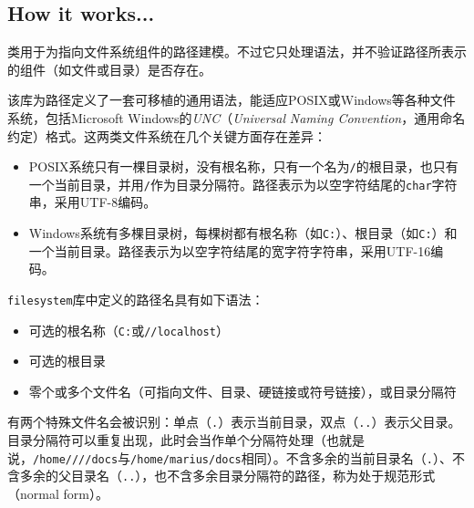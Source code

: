 
\subsection{How it works...}



类用于为指向文件系统组件的路径建模。不过它只处理语法，并不验证路径所表示的组件（如文件或目录）是否存在。



该库为路径定义了一套可移植的通用语法，能适应POSIX或Windows等各种文件系统，包括Microsoft Windows的\textit{UNC}（\textit{Universal} \textit{Naming Convention}，通用命名约定）格式。这两类文件系统在几个关键方面存在差异：



\begin{itemize}
\item POSIX系统只有一棵目录树，没有根名称，只有一个名为\texttt{/}的根目录，也只有一个当前目录，并用\texttt{/}作为目录分隔符。路径表示为以空字符结尾的\texttt{char}字符串，采用UTF-8编码。



\item Windows系统有多棵目录树，每棵树都有根名称（如\texttt{C:}）、根目录（如\texttt{C:}）和一个当前目录。路径表示为以空字符结尾的宽字符字符串，采用UTF-16编码。

\end{itemize}



\texttt{filesystem}库中定义的路径名具有如下语法：



\begin{itemize}
\item 可选的根名称（\texttt{C:}或\texttt{//\allowbreak{}localhost}）



\item 可选的根目录



\item 零个或多个文件名（可指向文件、目录、硬链接或符号链接），或目录分隔符

\end{itemize}



有两个特殊文件名会被识别：单点（\texttt{.}）表示当前目录，双点（\texttt{..}）表示父目录。目录分隔符可以重复出现，此时会当作单个分隔符处理（也就是说，\texttt{/\allowbreak{}home////\allowbreak{}docs}与\texttt{/\allowbreak{}home/\allowbreak{}marius/\allowbreak{}docs}相同）。不含多余的当前目录名（\texttt{.}）、不含多余的父目录名（\texttt{..}），也不含多余目录分隔符的路径，称为处于规范形式（normal form）。


